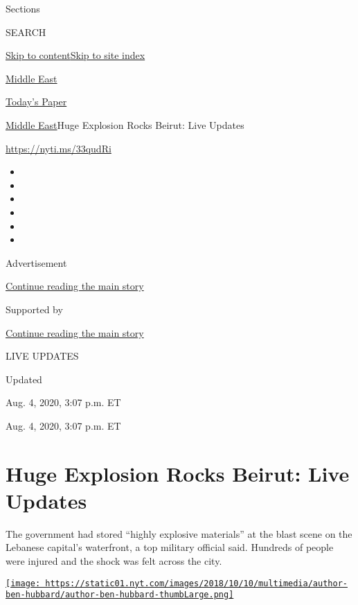 Sections

SEARCH

\protect\hyperlink{site-content}{Skip to
content}\protect\hyperlink{site-index}{Skip to site index}

\href{https://www.nytimes.com/section/world/middleeast}{Middle East}

\href{https://myaccount.nytimes.com/auth/login?response_type=cookie\&client_id=vi}{}

\href{https://www.nytimes.com/section/todayspaper}{Today's Paper}

\href{/section/world/middleeast}{Middle East}\textbar{}Huge Explosion
Rocks Beirut: Live Updates

\url{https://nyti.ms/33qudRi}

\begin{itemize}
\item
\item
\item
\item
\item
\item
\end{itemize}

Advertisement

\protect\hyperlink{after-top}{Continue reading the main story}

Supported by

\protect\hyperlink{after-sponsor}{Continue reading the main story}

LIVE UPDATES

Updated~

Aug. 4, 2020, 3:07 p.m. ET

Aug. 4, 2020, 3:07 p.m. ET

\hypertarget{huge-explosion-rocks-beirut-live-updates}{%
\section{Huge Explosion Rocks Beirut: Live
Updates}\label{huge-explosion-rocks-beirut-live-updates}}

The government had stored ``highly explosive materials'' at the blast
scene on the Lebanese capital's waterfront, a top military official
said. Hundreds of people were injured and the shock was felt across the
city.

\href{https://www.nytimes.com/by/ben-hubbard}{\texttt{[image: https://static01.nyt.com/images/2018/10/10/multimedia/author-ben-hubbard/author-ben-hubbard-thumbLarge.png]}}

